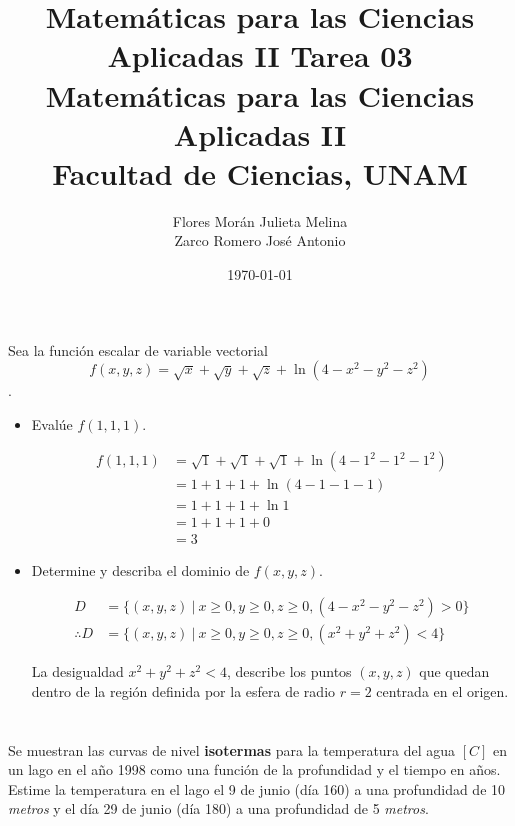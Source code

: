 \documentclass[12pt]{article}
\title{Matemáticas para las Ciencias Aplicadas II}
\title{
        \textbf{Tarea 03} \\
        \vspace{1ex}
        \large Matemáticas para las Ciencias Aplicadas II \\
        Facultad de Ciencias, UNAM}
\date{\today}
\author{Flores Morán Julieta Melina \\ Zarco Romero José Antonio}
\begin{document}
\maketitle

\section{}

Sea la función escalar de variable vectorial $$f(x,y,z)= \sqrt{x} +\sqrt{y} +\sqrt{z} + \ln{(4-x^2-y^2-z^2)}$$.

\begin{itemize}[format=\textbf]

\item Evalúe $f(1,1,1)$.

\begin{align*}
f(1,1,1)
&= \sqrt{1} +\sqrt{1} +\sqrt{1} + \ln{(4-1^2-1^2-1^2)} \\
&= 1+1+1+ \ln{(4-1-1-1)} \\
&= 1+1+1+ \ln{1} \\
&= 1+1+1+0 \\
&= 3
\end{align*}

\item Determine y describa el dominio de $f(x, y, z)$.

\begin{align*}
D
&=\{(x,y,z)~|~x \geq 0, y \geq 0, z \geq 0, (4-x^2-y^2-z^2) > 0\} \\
\therefore D
&= \{(x,y,z)~|~x \geq 0, y \geq 0, z \geq 0, (x^2+y^2+z^2) < 4\}
\end{align*}

La desigualdad $x^2+y^2+z^2<4$, describe los puntos $(x,y,z)$ que quedan dentro de la región definida por la esfera de radio $r=2$ centrada en el origen.

\end{itemize}

\section{}

Se muestran las curvas de nivel \textbf{isotermas} para la temperatura del agua $[C]$ en un lago en el año 1998 como una función de la profundidad y el tiempo en años. Estime la temperatura en el lago el 9 de junio (día 160) a una profundidad de 10 \textit{metros} y el día 29 de junio (día 180) a una profundidad de 5 \textit{metros}.
\end{document}
